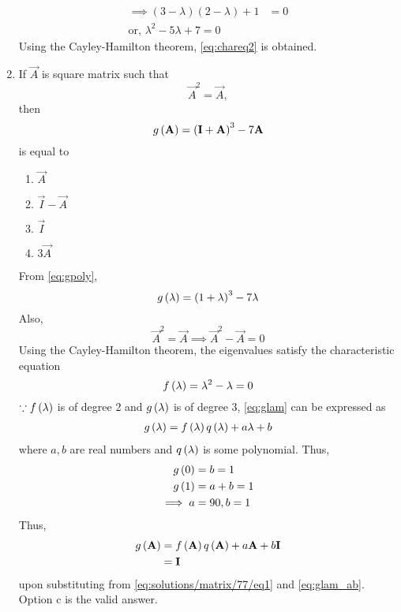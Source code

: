 \documentclass[journal,12pt,twocolumn]{IEEEtran}
\renewcommand\thesection{\arabic{section}}
\begin{document}
\begin{enumerate}[label=\thesection.\arabic*.,ref=\thesection.\theenumi]
\begin{align}
\\ \implies (3-\lambda)(2-\lambda)+1&=0
\\	\text{or, }\lambda^2-5\lambda+7=0
\end{align}
Using the Cayley-Hamilton theorem, \eqref{eq:chareq2} is obtained.
%
\item If $\vec{A}$ is square matrix such that 
\begin{equation}
	\vec{A}^2 = \vec{A},
   \end{equation}
   then 
   \begin{equation}
	\label{eq:gpoly}
	g\left(\mathbf{A}\right) = \left(\mathbf{I}+\mathbf{A}\right)^{3}-7\mathbf{A}
   \end{equation}
%
 is equal to
\begin{enumerate}
\item $\vec{A}$ \item  $\vec{I}-\vec{A}$ \item  $\vec{I}$ \item $3\vec{A}$
\end{enumerate}
%
\solution  From \eqref{eq:gpoly}, 
\begin{equation}
\label{eq:glam}
g\left(\lambda\right) = \left(1+\lambda\right)^{3}-7\lambda
\end{equation}
%
Also, 
\begin{equation}
 \vec{A}^2 = \vec{A} \implies \vec{A}^2 - \vec{A} = 0 
\end{equation}
Using the Cayley-Hamilton theorem, the eigenvalues satisfy the characteristic equation 
%
\begin{equation}\label{eq:solutions/matrix/77/eq1}
f\left(\lambda\right) = \lambda^2 - \lambda = 0 
\end{equation}
$\because  f\left(\lambda\right)$  is of degree 2 and $g\left(\lambda\right) $ is of degree 3, \eqref{eq:glam} can be expressed as
\begin{align}
	g\left(\lambda\right)	 = f\left(\lambda\right)		q\left(\lambda\right)	+ a\lambda +b
\end{align}
%
where $a, b$ are real numbers and $q\left(\lambda\right)$ is some polynomial.  Thus, 
\begin{align}
	g\left(0\right)	 &= b = 1
	\\
	g\left(1\right)	 &= a+b = 1
	\\
	\implies a &= 90, b = 1
	\label{eq:glam_ab}
\end{align}
Thus, 
\begin{align}
	g\left(\mathbf{A}\right) &= f\left(\mathbf{A}\right)		q\left(\mathbf{A}\right)	+ a\mathbf{A} +b\mathbf{I}
	\\
	&= \mathbf{I}
\end{align}
upon substituting from \eqref{eq:solutions/matrix/77/eq1} and \eqref{eq:glam_ab}.
Option c is the valid answer.


\end{enumerate}
\end{document}
